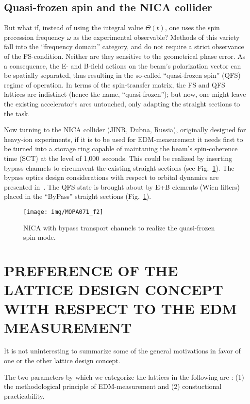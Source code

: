 \documentclass[a4paper]{jacow}
\begin{document}
\subsection{Quasi-frozen spin and the NICA collider}
But what if, instead of using the integral value $\Theta(t)$, one uses the spin precession frequency $\omega$ as the experimental observable? Methods of this variety fall into the ``frequency domain'' category, and do not require a strict observance of the FS-condition. Neither are they sensitive to the geometrical phase error. As a consequence, the E- and B-field actions on the beam's polarization vector can be spatially separated, thus resulting in the so-called ``quasi-frozen spin'' (QFS) regime of operation. In terms of the spin-transfer matrix, the FS and QFS lattices are indistinct (hence the name, ``quasi-frozen''); but now, one might leave the existing accelerator's arcs untouched, only adapting the straight sections to the task.

Now turning to the NICA collider (JINR, Dubna, Russia), originally designed for heavy-ion experiments, if it is to be used for EDM-measurement it needs first to be turned into a storage ring capable of maintaning the beam's spin-coherence time (SCT) at the level of 1,000~seconds. This could be realized by inserting bypass channels to circumvent the existing straight sections (see Fig.~\ref{fig:NICA+bypass}). The bypass optics design considerations with respect to orbital dynamics are presented in~\cite{Kolokolchikov:Bypass}. The QFS state is brought about by E+B elements (Wien filters) placed in the ``ByPass'' straight sections (Fig.~\ref{fig:NICA+bypass}).

\begin{figure}[h]
	\texttt{[image: img/MOPA071\_f2]}
	\caption{NICA with bypass transport channels to realize the quasi-frozen spin mode.\label{fig:NICA+bypass}}
\end{figure}

\section{PREFERENCE OF THE LATTICE DESIGN CONCEPT WITH RESPECT TO THE EDM MEASUREMENT}

It is not uninteresting to summarize some of the general motivations in favor of one or the other lattice design concept.

The two parameters by which we categorize the lattices in the following are : (1) the methodological principle of EDM-measurement and (2) constuctional practicability.
\end{document}
